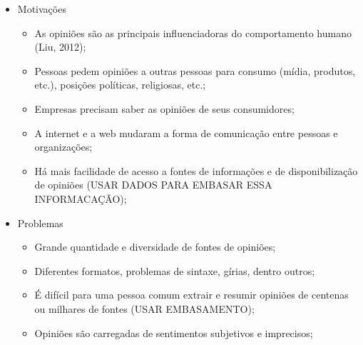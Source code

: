 \documentclass[msc, a4paper, classic, pt]{ufbathesis}
\begin{document}

\begin{itemize}

\item Motivações
\begin{itemize}
\item As opiniões são as principais influenciadoras do comportamento humano (Liu, 2012);
\item Pessoas pedem opiniões a outras pessoas para consumo (mídia, produtos, etc.), posições políticas, religiosas, etc.;
\item Empresas precisam saber as opiniões de seus consumidores;
\item A internet e a web mudaram a forma de comunicação entre pessoas e organizações;
\item Há mais facilidade de acesso a fontes de informações e de disponibilização de opiniões (USAR DADOS PARA EMBASAR ESSA INFORMACAÇÃO);
\end{itemize}

\item Problemas
\begin{itemize}
\item Grande quantidade e diversidade de fontes de opiniões;
\item Diferentes formatos, problemas de sintaxe, gírias, dentro outros;
\item É difícil para uma pessoa comum extrair e resumir opiniões de centenas ou milhares de fontes (USAR EMBASAMENTO);
\item Opiniões são carregadas de sentimentos subjetivos e imprecisos;
\end{itemize}


\end{itemize}
\end{document}
